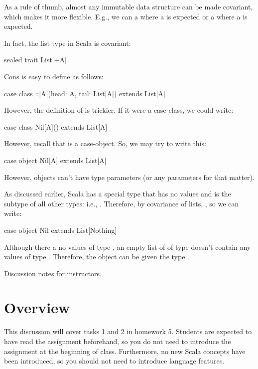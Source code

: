 \documentclass[9pt]{extbook}
\begin{document}
As a rule of thumb, almost any immutable data structure can be made
covariant, which makes it more flexible. E.g., we can a 
where a  is expected or a 
where a  is expected.

In fact, the list type in Scala is covariant:
%
\begin{scalacode}
sealed trait List[+A]
\end{scalacode}
Cons is easy to define as follows:
\begin{scalacode}
case class ::[A](head: A, tail: List[A]) extends List[A]
\end{scalacode}
However, the definition of  is trickier. If it were a case-class,
we could write:
\begin{scalacode}
case class Nil[A]() extends List[A]
\end{scalacode}
However, recall that  is a case-object. So, we may try to
write this:
\begin{scalacode}
case object Nil[A] extends List[A]
\end{scalacode}
However, objects can't have type parameters (or any parameters for that matter).

As discussed earlier, Scala has a special type  that has no values
and is the subtype of all other types: i.e.,
. Therefore, by covariance of lists, , so
we can write:
\begin{scalacode}
case object Nil extends List[Nothing]
\end{scalacode}
Although there a no values of type , an empty list of
of type  doesn't contain any values of type .
Therefore, the  object can be given the type .


Discussion notes for instructors.

\section{Overview}

This discussion will cover tasks 1 and 2 in homework 5.  Students are expected to have read the assignment beforehand, so you do not need to introduce the assignment at the beginning of class.  Furthermore, no new Scala concepts have been introduced, so you should not need to introduce language features.
\end{document}
